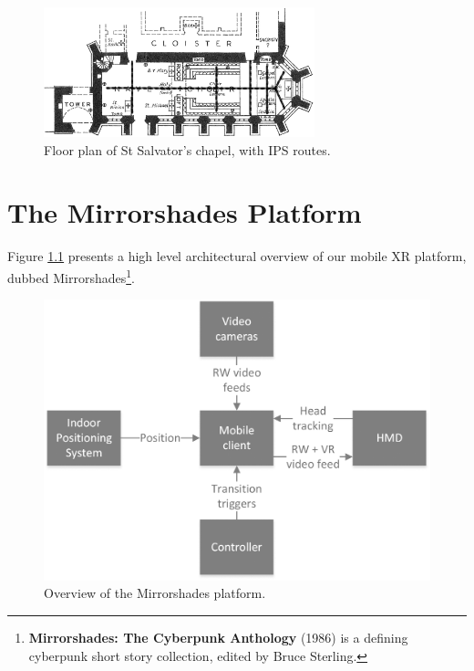 \documentclass[oneside]{book}
\begin{document}
\begin{figure}[h]
	\begin{center}
		\includegraphics[width=0.7\textwidth]{images/sallies_layout.png}
		\caption{Floor plan of St Salvator's chapel, with IPS routes.}
		\label{sallies_layout}
	\end{center}
\end{figure}

\clearpage


\chapter{The Mirrorshades Platform}
Figure \ref{systemarchitecture} presents a high level architectural overview of our mobile XR platform, dubbed Mirrorshades\footnote{\textbf{Mirrorshades: The Cyberpunk Anthology} (1986) is a defining cyberpunk short story collection, edited by Bruce Sterling.}.

\begin{figure}[h]
	\thispagestyle{empty}
	\begin{center}
		\includegraphics[width=.5\linewidth]{images/system-architecture.png}
		\caption{Overview of the Mirrorshades platform.}
		\label{systemarchitecture}
	\end{center}
\end{figure}
\end{document}
